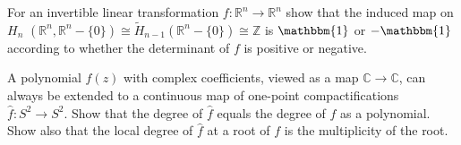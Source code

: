 \documentclass[12pt]{article}
\newcommand{\Z}{\mathbb{Z}}
\newcommand{\R}{\mathbb{R}}
\begin{document}
\begin{statement}[5]
  For an invertible linear transformation $f: \R^n \to \R^n$ show that the induced map on $H_n$ 
  $(\R^n, \R^n - \{0\}) \cong \tilde{H}_{n-1}(\R^n - \{0\}) \cong \Z$ is $\mathbbm{1}$ or $-\mathbbm{1}$ 
  according to whether the determinant of $f$ is positive or negative.
\end{statement}
\begin{newproof}

\end{newproof}

\begin{statement}[6]
  A polynomial $f(z)$ with complex coefficients, viewed as a map $\mathbb{C} \to \mathbb{C}$, can always be extended 
  to a continuous map of one-point compactifications $\hat{f}:S^2 \to S^2$. Show that the degree of $\hat{f}$ 
  equals the degree of $f$ as a polynomial. Show also that the local degree of $\hat{f}$ at a root of $f$ 
  is the multiplicity of the root.
\end{statement}
\begin{newproof}

\end{newproof}
\end{document}
